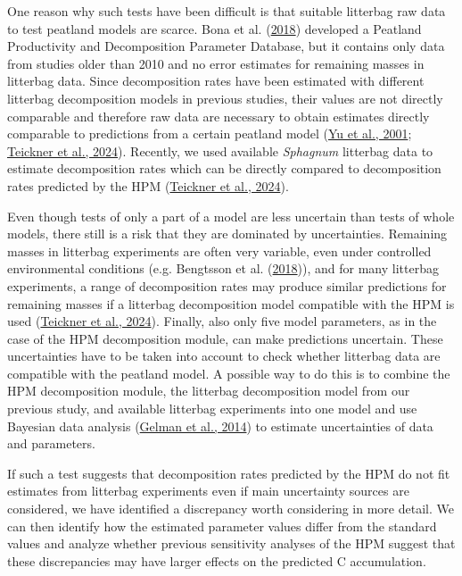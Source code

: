 \documentclass[
  12pt,
]{article}
\begin{document}
One reason why such tests have been difficult is that suitable litterbag raw data to test peatland models are scarce. Bona et al. (\protect\hyperlink{ref-Bona.2018}{2018}) developed a Peatland Productivity and Decomposition Parameter Database, but it contains only data from studies older than 2010 and no error estimates for remaining masses in litterbag data. Since decomposition rates have been estimated with different litterbag decomposition models in previous studies, their values are not directly comparable and therefore raw data are necessary to obtain estimates directly comparable to predictions from a certain peatland model (\protect\hyperlink{ref-Yu.2001}{Yu et al., 2001}; \protect\hyperlink{ref-Teickner.2024}{Teickner et al., 2024}). Recently, we used available \emph{Sphagnum} litterbag data to estimate decomposition rates which can be directly compared to decomposition rates predicted by the HPM (\protect\hyperlink{ref-Teickner.2024}{Teickner et al., 2024}).

Even though tests of only a part of a model are less uncertain than tests of whole models, there still is a risk that they are dominated by uncertainties. Remaining masses in litterbag experiments are often very variable, even under controlled environmental conditions (e.g. Bengtsson et al. (\protect\hyperlink{ref-Bengtsson.2018}{2018})), and for many litterbag experiments, a range of decomposition rates may produce similar predictions for remaining masses if a litterbag decomposition model compatible with the HPM is used (\protect\hyperlink{ref-Teickner.2024}{Teickner et al., 2024}). Finally, also only five model parameters, as in the case of the HPM decomposition module, can make predictions uncertain. These uncertainties have to be taken into account to check whether litterbag data are compatible with the peatland model. A possible way to do this is to combine the HPM decomposition module, the litterbag decomposition model from our previous study, and available litterbag experiments into one model and use Bayesian data analysis (\protect\hyperlink{ref-Gelman.2014}{Gelman et al., 2014}) to estimate uncertainties of data and parameters.

If such a test suggests that decomposition rates predicted by the HPM do not fit estimates from litterbag experiments even if main uncertainty sources are considered, we have identified a discrepancy worth considering in more detail. We can then identify how the estimated parameter values differ from the standard values and analyze whether previous sensitivity analyses of the HPM suggest that these discrepancies may have larger effects on the predicted C accumulation.
\end{document}
